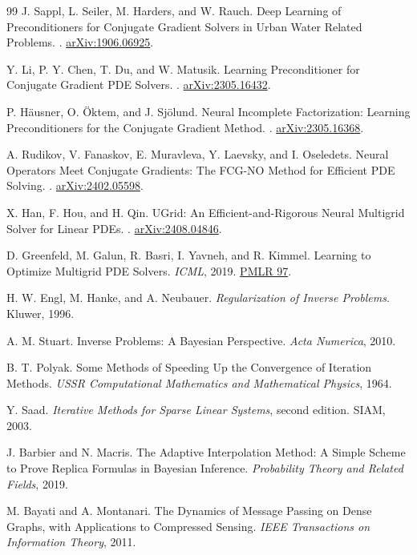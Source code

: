 \documentclass[11pt,a4paper]{article}
\begin{document}
\begin{thebibliography}{99}
J. Sappl, L. Seiler, M. Harders, and W. Rauch.
\newblock Deep Learning of Preconditioners for Conjugate Gradient Solvers in Urban Water Related Problems.
. \href{https://arxiv.org/abs/1906.06925}{arXiv:1906.06925}.

Y. Li, P. Y. Chen, T. Du, and W. Matusik.
\newblock Learning Preconditioner for Conjugate Gradient PDE Solvers.
. \href{https://arxiv.org/abs/2305.16432}{arXiv:2305.16432}.

P. Häusner, O. Öktem, and J. Sjölund.
\newblock Neural Incomplete Factorization: Learning Preconditioners for the Conjugate Gradient Method.
. \href{https://arxiv.org/abs/2305.16368}{arXiv:2305.16368}.

A. Rudikov, V. Fanaskov, E. Muravleva, Y. Laevsky, and I. Oseledets.
\newblock Neural Operators Meet Conjugate Gradients: The FCG-NO Method for Efficient PDE Solving.
. \href{https://arxiv.org/abs/2402.05598}{arXiv:2402.05598}.

X. Han, F. Hou, and H. Qin.
\newblock UGrid: An Efficient-and-Rigorous Neural Multigrid Solver for Linear PDEs.
. \href{https://arxiv.org/abs/2408.04846}{arXiv:2408.04846}.

D. Greenfeld, M. Galun, R. Basri, I. Yavneh, and R. Kimmel.
\newblock Learning to Optimize Multigrid PDE Solvers.
\newblock \emph{ICML}, 2019. \href{https://proceedings.mlr.press/v97/greenfeld19a.html}{PMLR 97}.

H. W. Engl, M. Hanke, and A. Neubauer.
\newblock \emph{Regularization of Inverse Problems}.
\newblock Kluwer, 1996.

A. M. Stuart.
\newblock Inverse Problems: A Bayesian Perspective.
\newblock \emph{Acta Numerica}, 2010.

B. T. Polyak.
\newblock Some Methods of Speeding Up the Convergence of Iteration Methods.
\newblock \emph{USSR Computational Mathematics and Mathematical Physics}, 1964.

Y. Saad.
\newblock \emph{Iterative Methods for Sparse Linear Systems}, second edition.
\newblock SIAM, 2003.

J. Barbier and N. Macris.
\newblock The Adaptive Interpolation Method: A Simple Scheme to Prove Replica Formulas in Bayesian Inference.
\newblock \emph{Probability Theory and Related Fields}, 2019.

M. Bayati and A. Montanari.
\newblock The Dynamics of Message Passing on Dense Graphs, with Applications to Compressed Sensing.
\newblock \emph{IEEE Transactions on Information Theory}, 2011.

\end{thebibliography}
\end{document}
